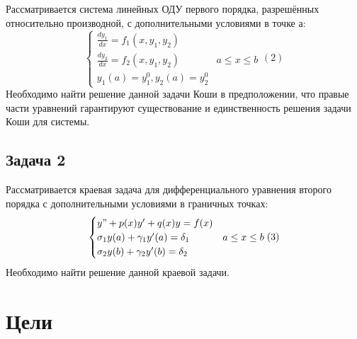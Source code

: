 \documentclass[a4paper,12pt,titlepage,finall]{article}
\begin{document}
Рассматривается система линейных ОДУ первого порядка, разрешённых относительно производной, с дополнительными условиями в точке а:
\begin{equation*}
\begin{cases}
\frac{dy_{1}}{dx} = f_{1}(x, y_{1}, y_{2})\\
\frac{dy_{2}}{dx} = f_{2}(x, y_{1}, y_{2})
 &  a \leq x \leq b  \\
y_{1}(a) = y_{1}^{0},  y_{2}(a) = y_{2}^{0}
\end{cases}
(2)
\end{equation*}
Необходимо найти решение данной задачи Коши  в предположении, что правые части уравнений гарантируют существование и единственность решения задачи Коши для системы.

\subsection{Задача 2}
Рассматривается  краевая задача для дифференциального уравнения второго порядка с дополнительными условиями в граничных точках:
\begin{equation*}
\begin{cases}
y"+p(x)y'+q(x)y = f(x) \\
\sigma_{1}y(a) + \gamma_{1}y'(a) = \delta_{1} &  a \leq x \leq b  \\
\sigma_{2}y(b) + \gamma_{2}y'(b) = \delta_{2}
\end{cases}
(3)
\end{equation*}
Необходимо найти решение данной краевой задачи.


\newpage

\section{Цели}
\end{document}
